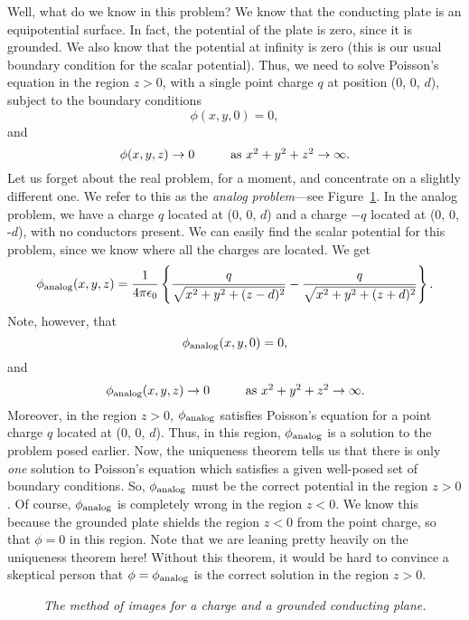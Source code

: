 Well, what do we know in this problem? We know that the conducting plate is an
 equipotential surface. In fact, the potential of the plate is zero, since it is grounded. 
We also know that the potential at infinity is zero (this is our usual boundary
condition for the scalar potential). Thus, we need to solve Poisson's equation
in the region $z>0$, with a single point charge $q$ at position (0, 0, $d$),
subject to the boundary conditions
\begin{equation}
\phi(x,y,0) = 0,
\end{equation}
and
\begin{equation}
\phi(x,y,z)\rightarrow 0\mbox{\hspace{1cm}as $x^2+y^2+z^2\rightarrow\infty$}.
\end{equation}
Let us forget about the real problem, for a
moment, and concentrate on a slightly different one. We refer to this as the
{\em analog problem}---see Figure~\ref{fimage}. In the analog problem, we have a charge $q$ located at
(0, 0, $d$) and a charge $-q$ located at (0, 0, -$d$), with no conductors present.
We can easily find the scalar potential for this problem, since we know where
all the charges are located. We get
\begin{equation}\label{e5.114}
\phi_{\rm analog} (x, y, z) = \frac{1}{4\pi\epsilon_0}
\left\{ \frac{q}{\sqrt{x^2+y^2+(z-d)^2}}- \frac{q}{\sqrt{x^2+y^2+
(z+d)^2}}\right\}.
\end{equation}
Note, however, that
\begin{equation}
\phi_{\rm analog}(x,y,0) = 0,
\end{equation}
 and
\begin{equation}
\phi_{\rm analog}(x,y,z)\rightarrow 0\mbox{\hspace{1cm}as $x^2+y^2+z^2\rightarrow\infty$}.
\end{equation}
Moreover, in the region $z>0$, $\phi_{\rm analog}$
 satisfies Poisson's equation
for  a point charge $q$ located at (0, 0, $d$). Thus, in this region, $\phi_{\rm analog}$
 is a solution
to the problem posed earlier. Now, the uniqueness theorem tells
us that there is only {\em one}\/ solution to Poisson's equation
which satisfies a given well-posed set of boundary conditions. So, 
$\phi_{\rm analog}$ must be the correct potential in the region $z>0$.
Of course, $\phi_{\rm analog}$ is completely wrong in the region $z<0$.
We know this because the grounded plate shields the region $z<0$ from the
point charge, so that $\phi=0$ in this region. Note that we are leaning pretty
heavily on the uniqueness theorem here! Without this theorem,
 it would be hard to convince
a skeptical person that $\phi = \phi_{\rm analog}$ is the correct solution
in the region $z>0$. 
\begin{figure}
\epsfysize=2.5in
\centerline{}
\caption{\em The method of images for a charge and a grounded conducting plane.}\label{fimage}
\end{figure}

